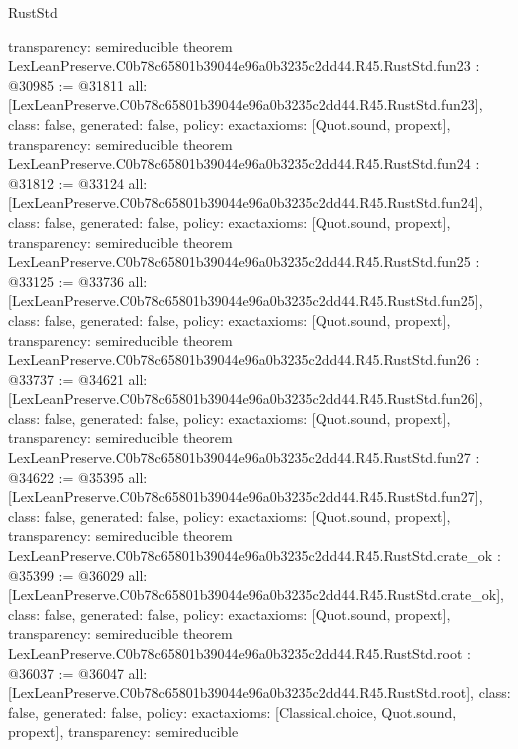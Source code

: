 \begin{lexlean}{RustStd}
\begin{coremodule}
{  transparency: semireducible
}
theorem LexLeanPreserve.C0b78c65801b39044e96a0b3235c2dd44.R45.RustStd.fun23 : @30985 := @31811 {
  all: [LexLeanPreserve.C0b78c65801b39044e96a0b3235c2dd44.R45.RustStd.fun23],
  class: false,
  generated: false,
  policy: exact{axioms: [Quot.sound, propext]},
  transparency: semireducible
}
theorem LexLeanPreserve.C0b78c65801b39044e96a0b3235c2dd44.R45.RustStd.fun24 : @31812 := @33124 {
  all: [LexLeanPreserve.C0b78c65801b39044e96a0b3235c2dd44.R45.RustStd.fun24],
  class: false,
  generated: false,
  policy: exact{axioms: [Quot.sound, propext]},
  transparency: semireducible
}
theorem LexLeanPreserve.C0b78c65801b39044e96a0b3235c2dd44.R45.RustStd.fun25 : @33125 := @33736 {
  all: [LexLeanPreserve.C0b78c65801b39044e96a0b3235c2dd44.R45.RustStd.fun25],
  class: false,
  generated: false,
  policy: exact{axioms: [Quot.sound, propext]},
  transparency: semireducible
}
theorem LexLeanPreserve.C0b78c65801b39044e96a0b3235c2dd44.R45.RustStd.fun26 : @33737 := @34621 {
  all: [LexLeanPreserve.C0b78c65801b39044e96a0b3235c2dd44.R45.RustStd.fun26],
  class: false,
  generated: false,
  policy: exact{axioms: [Quot.sound, propext]},
  transparency: semireducible
}
theorem LexLeanPreserve.C0b78c65801b39044e96a0b3235c2dd44.R45.RustStd.fun27 : @34622 := @35395 {
  all: [LexLeanPreserve.C0b78c65801b39044e96a0b3235c2dd44.R45.RustStd.fun27],
  class: false,
  generated: false,
  policy: exact{axioms: [Quot.sound, propext]},
  transparency: semireducible
}
theorem LexLeanPreserve.C0b78c65801b39044e96a0b3235c2dd44.R45.RustStd.crate_ok : @35399 := @36029 {
  all: [LexLeanPreserve.C0b78c65801b39044e96a0b3235c2dd44.R45.RustStd.crate_ok],
  class: false,
  generated: false,
  policy: exact{axioms: [Quot.sound, propext]},
  transparency: semireducible
}
theorem LexLeanPreserve.C0b78c65801b39044e96a0b3235c2dd44.R45.RustStd.root : @36037 := @36047 {
  all: [LexLeanPreserve.C0b78c65801b39044e96a0b3235c2dd44.R45.RustStd.root],
  class: false,
  generated: false,
  policy: exact{axioms: [Classical.choice, Quot.sound, propext]},
  transparency: semireducible
}


\end{coremodule}
\end{lexlean}

